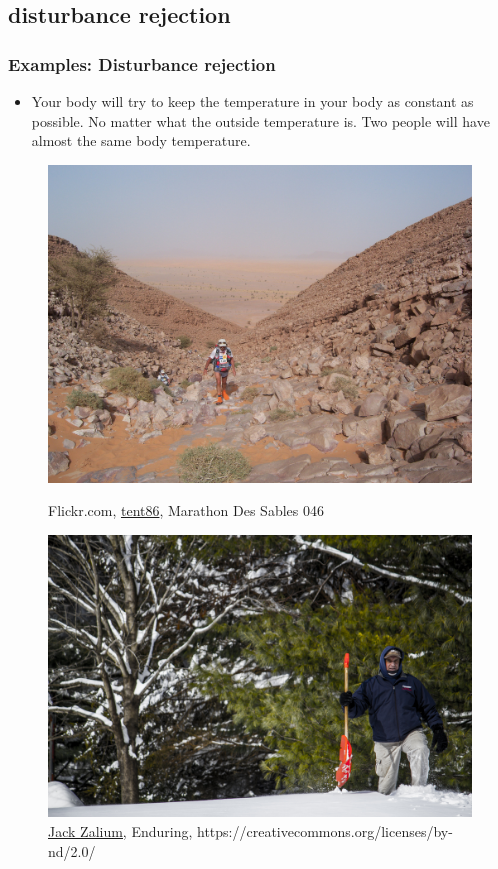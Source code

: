\subsection[disturbance rejection]{disturbance rejection}
\begin{frame}
	\frametitle{Examples: Disturbance rejection}
	\begin{itemize}
		\item Your body will try to keep the temperature in your body as constant as possible. No matter what the outside temperature is. Two people will have almost the same body temperature.
	\end{itemize}
	\begin{figure}
\centering
\begin{minipage}{0.45\textwidth}
\includegraphics[width=0.7\linewidth]{marathon-des-sables}
\caption{Flickr.com, \underline{tent86}, Marathon Des Sables 046}
\label{fig:marathon-des-sables}
\end{minipage}
\centering
\begin{minipage}{0.45\textwidth}
\includegraphics[width=0.7\linewidth]{enduring}
\caption{\underline{Jack Zalium,} Enduring, https://creativecommons.org/licenses/by-nd/2.0/}
\label{fig:enduring}
\end{minipage}
\end{figure}

\end{frame}

